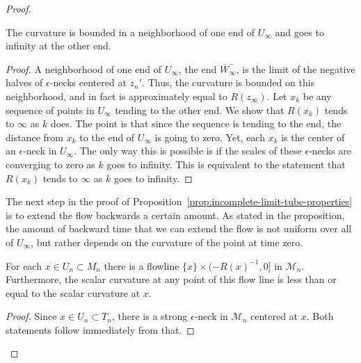\begin{proof}
\begin{claim}
\label{claim:curvature-bounded-one-end-infinite-other}
The curvature is bounded in a neighborhood of one end of $U_\infty$
and goes to infinity at the other end.
\end{claim}

\begin{proof}
 A neighborhood of one end of $U_\infty$, the end $\overline W^-_\infty$,
 is the limit of the
 negative halves of $\epsilon$-necks centered at $z_n'$.
 Thus, the curvature is bounded on this neighborhood, and in fact is
approximately equal to $R(z_\infty)$. Let $x_k$ be any sequence of
points in $U_\infty$ tending to the other end. We show that $R(x_k)$
tends to $\infty$ as $k$ does. The point is that since the sequence
is tending to the end, the distance from $x_k$ to the end of
$U_\infty$ is going to zero. Yet, each $x_k$ is the center of an
$\epsilon$-neck in $U_\infty$. The only way this is possible is if
the scales of these $\epsilon$-necks are converging to zero as $k$
goes to infinity. This is equivalent to the statement that $R(x_k)$
tends to $\infty$ as $k$ goes to infinity.
\end{proof}


The next step in the proof of Proposition~\ref{prop:incomplete-limit-tube-properties} is to extend
the flow backwards a certain amount. As stated in the proposition,
the amount of backward time that we can extend the flow is not
uniform over all of $U_\infty$, but rather depends on the curvature
of the point at time zero.



\begin{claim}
\label{claim:flowline-exists-for-x}
For each $x\in U_n\subset M_n$ there is a flowline $\{x\}\times
(-R(x)^{-1},0]$ in ${\mathcal M}_n$. Furthermore, the scalar
curvature at any point of this flow line is less than or equal to
the scalar curvature at $x$.
\end{claim}


\begin{proof}
Since $x\in U_n\subset T_n$, there is a strong $\epsilon$-neck in
${\mathcal M}_n$ centered at $x$. Both statements follow immediately
from that.
\end{proof}



\end{proof}
